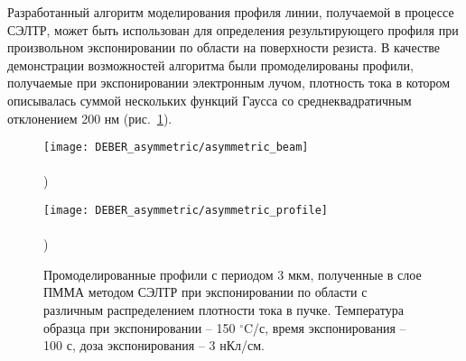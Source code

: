 Разработанный алгоритм моделирования профиля линии, получаемой в процессе СЭЛТР, может быть использован для определения результирующего профиля при произвольном экспонировании по области на поверхности резиста. В качестве демонстрации возможностей алгоритма были промоделированы профили, получаемые при экспонировании электронным лучом, плотность тока в котором описывалась суммой нескольких функций Гаусса со среднеквадратичным отклонением 200 нм (рис.~\ref{fig:DEBER_multibeam}).

\begin{figure}[h]	
	\begin{minipage}{0.48\textwidth}
		\texttt{[image: DEBER\_asymmetric/asymmetric\_beam]} \\
		\vspace{-12em} \\ ) \\ \vspace{12em}
	\end{minipage}
	\begin{minipage}{0.48\textwidth}
		\texttt{[image: DEBER\_asymmetric/asymmetric\_profile]} \\
		\vspace{-12em} \\ ) \\ \vspace{12em}
	\end{minipage}
	\vspace{-4em}
	\caption{Промоделированные профили с периодом 3 мкм, полученные в слое ПММА методом СЭЛТР при экспонировании по области с различным распределением плотности тока в пучке. Температура образца при экспонировании -- 150 $^\circ$C/с, время экспонирования -- 100 с, доза экспонирования -- 3 нКл/см.}
	\label{fig:DEBER_multibeam}
\end{figure}
